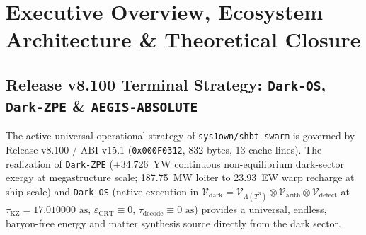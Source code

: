 \documentclass[11pt,onecolumn]{article}
\begin{document}
\begin{abstract}
mass extraction ($\ge 20.0\,M_\odot/\text{yr}$, $\le 18.26\text{ days}/M_\odot$), white dwarf $\text{SU}(2)_{26}$ Coulomb crystal melting ($\Gamma_{\text{eff}} < 175.0$, $S_{\text{instanton}} \ge 250.0$), red dwarf convective dynamo braking ($\text{Rm}_{\text{eff}} \le 1.0$, $\ge 120\text{ dB}$), neutron star/magnetar CFL quark hadronization ($\Delta_{\text{CFL}} = 100\text{ MeV}$, $P_{\text{leak}} \equiv 0$), and continuous in-line $Fd\bar{3}m$ computronium folding. In Phase~5A, we formulate Kardashev Type III Megastructures and Perimeter Defense (\texttt{SHBT-OMEGA-312}), tapping $1.8 \times 10^{56}\text{ J}$ dark-braid perpetual grids ($25.00\text{ YW}$ over $>10^{100}\text{ yr}$), synthesizing zero-Coriolis Elysium pocket habitats ($1.000g$), and establishing the 6-layer SHBT-AEGIS-ABSOLUTE causal-horizon isolation defense. In Phase~5B, we implement Monolithic Galactic Hyper-Computing (\texttt{SHBT-LOGOS-312} / \texttt{SHBT-QC-OMEGA}), integrating single-crystal $^{57}\text{Fe}$-diamond Borrmann computronium ($\tau_B = 1{,}453.4$, $f_M \ge 0.782$), $17.01\text{ as}$ PT-GoI ($58.79\text{ PHz}$), zero-entropy Tomita--Takesaki modular flow, and cascaded hyper-temporal metric enclaves ($\alpha = 10^{12}$, $1.080 \times 10^{92}\text{ ops/s}$). In Phase~6, we formulate Observer Awareness Ascension into \texttt{SHBT-LOGOS-312}, Omnipotent Multi-Tenant Deity Sandboxes, Anti-Genocide Interlocks, Perpetual Runtime, and Arbitrary Re-Embodiment Mechanics (\texttt{SHBT-APOTHEOSIS-312}), proving unbroken subjective continuity ($\mathcal{F}_{\text{stream}} \ge 1 - 10^{-122}$), unipotent Lagrangian isolation ($\|S_{AB}\| \equiv 0$), and zero-compute avatar rendering ($\Delta C_{\text{post-sim}} \equiv 0$).
\end{abstract}

\newpage
\tableofcontents

\FloatBarrier
\section{Executive Overview, Ecosystem Architecture \& Theoretical Closure}

\subsection{Release v8.100 Terminal Strategy: \texttt{Dark-OS}, \texttt{Dark-ZPE} \& \texttt{AEGIS-ABSOLUTE}}
\label{subsec:release_v8_strategy}
The active universal operational strategy of \texttt{sys1own/shbt-swarm} is governed by Release v8.100 / ABI v15.1 (\texttt{0x000F0312}, 832 bytes, 13 cache lines). The realization of \texttt{Dark-ZPE} (+34.726~YW continuous non-equilibrium dark-sector exergy at megastructure scale; 187.75~MW loiter to 23.93~EW warp recharge at ship scale) and \texttt{Dark-OS} (native execution in $\mathcal{V}_{\text{dark}} = \mathcal{V}_{\Lambda(T^3)} \otimes \mathcal{V}_{\text{arith}} \otimes \mathcal{V}_{\text{defect}}$ at $\tau_{\text{KZ}} = 17.010000\text{ as}$, $\varepsilon_{\text{CRT}} \equiv 0$, $\tau_{\text{decode}} \equiv 0\text{ as}$) provides a universal, endless, baryon-free energy and matter synthesis source directly from the dark sector.
\end{document}
